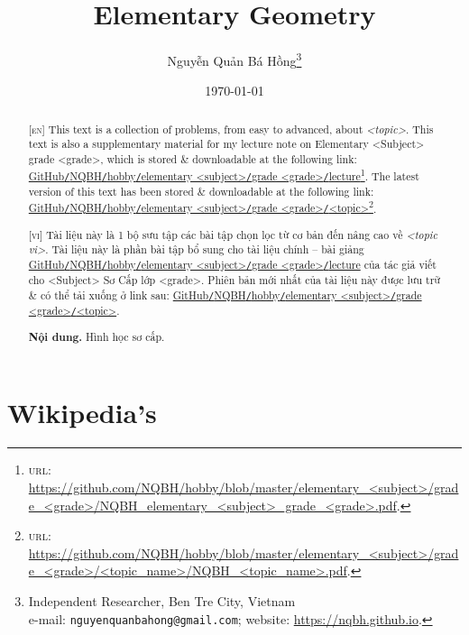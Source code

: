 \documentclass{article}
\title{Elementary Geometry}
\author{Nguyễn Quản Bá Hồng\footnote{Independent Researcher, Ben Tre City, Vietnam\\e-mail: \texttt{nguyenquanbahong@gmail.com}; website: \url{https://nqbh.github.io}.}}
\date{\today}
\begin{document}
\maketitle
\begin{abstract}
	\textsc{[en]} This text is a collection of problems, from easy to advanced, about \textit{<topic>}. This text is also a supplementary material for my lecture note on Elementary <Subject> grade <grade>, which is stored \& downloadable at the following link: \href{https://github.com/NQBH/hobby/blob/master/elementary_<subject>/grade_<grade>/NQBH_elementary_<subject>_grade_<grade>.pdf}{GitHub\texttt{/}NQBH\texttt{/}hobby\texttt{/}elementary <subject>\texttt{/}grade <grade>\texttt{/}lecture}\footnote{\textsc{url}: \url{https://github.com/NQBH/hobby/blob/master/elementary_<subject>/grade_<grade>/NQBH_elementary_<subject>_grade_<grade>.pdf}.}. The latest version of this text has been stored \& downloadable at the following link: \href{https://github.com/NQBH/hobby/blob/master/elementary_<subject>/grade_<grade>/<topic_name>/NQBH_<topic_name>.pdf}{GitHub\texttt{/}NQBH\texttt{/}hobby\texttt{/}elementary <subject>\texttt{/}grade <grade>\texttt{/}<topic>}\footnote{\textsc{url}: \url{https://github.com/NQBH/hobby/blob/master/elementary_<subject>/grade_<grade>/<topic_name>/NQBH_<topic_name>.pdf}.}.
	\vspace{2mm}
	
	\textsc{[vi]} Tài liệu này là 1 bộ sưu tập các bài tập chọn lọc từ cơ bản đến nâng cao về \textit{<topic vi>}. Tài liệu này là phần bài tập bổ sung cho tài liệu chính -- bài giảng \href{https://github.com/NQBH/hobby/blob/master/elementary_<subject>/grade_<grade>/NQBH_elementary_<subject>_grade_<grade>.pdf}{GitHub\texttt{/}NQBH\texttt{/}hobby\texttt{/}elementary <subject>\texttt{/}grade <grade>\texttt{/}lecture} của tác giả viết cho <Subject> Sơ Cấp lớp <grade>. Phiên bản mới nhất của tài liệu này được lưu trữ \& có thể tải xuống ở link sau: \href{https://github.com/NQBH/hobby/blob/master/elementary_<subject>/grade_<grade>/<topic_name>/NQBH_<topic_name>.pdf}{GitHub\texttt{/}NQBH\texttt{/}hobby\texttt{/}elementary <subject>\texttt{/}grade <grade>\texttt{/}<topic>}.
	
	\textsf{\textbf{Nội dung.} Hình học sơ cấp.}
\end{abstract}
\tableofcontents
\newpage


\section{Wikipedia's}
\end{document}
